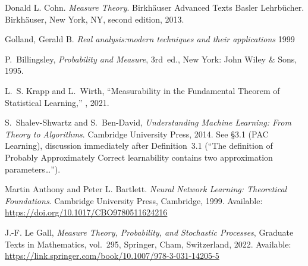 \begin{thebibliography}{999}

    Donald L. Cohn.
    \textit{Measure Theory}.
    Birkhäuser Advanced Texts Basler Lehrbücher.
    Birkhäuser, New York, NY, second edition, 2013.

    Golland, Gerald B.
    \textit{Real analysis:modern techniques and their applications}
    1999

    P.~Billingsley, \emph{Probability and Measure}, 3rd~ed., New York: John Wiley \& Sons, 1995.

    L.~S. Krapp and L.~Wirth,
    \newblock ``Measurability in the Fundamental Theorem of Statistical Learning,''
    , 2021.

    S.~Shalev\hyp{}Shwartz and S.~Ben\hyp{}David,
    \emph{Understanding Machine Learning: From Theory to Algorithms}.
    Cambridge University Press, 2014.
    See \S3.1 (PAC Learning), discussion immediately after Definition~3.1
    (“The definition of Probably Approximately Correct learnability contains two approximation parameters…”).

%
%
%
%

    Martin Anthony and Peter L. Bartlett.
    \textit{Neural Network Learning: Theoretical Foundations}.
    Cambridge University Press, Cambridge, 1999.
    Available: \url{https://doi.org/10.1017/CBO9780511624216}

    J.-F. Le Gall,
    \textit{Measure Theory, Probability, and Stochastic Processes},
    Graduate Texts in Mathematics, vol.~295,
    Springer, Cham, Switzerland, 2022.
    Available: \url{https://link.springer.com/book/10.1007/978-3-031-14205-5}


\end{thebibliography}
